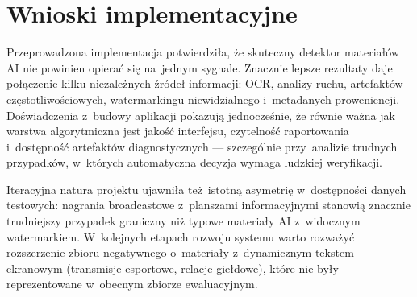 \section{Wnioski implementacyjne}

Przeprowadzona implementacja potwierdziła, że skuteczny detektor materiałów AI
nie powinien opierać się na~jednym sygnale. Znacznie lepsze rezultaty
daje połączenie kilku niezależnych źródeł informacji:
OCR, analizy ruchu, artefaktów częstotliwościowych,
watermarkingu niewidzialnego i~metadanych proweniencji.
Doświadczenia z~budowy aplikacji pokazują jednocześnie,
że równie ważna jak warstwa algorytmiczna jest jakość
interfejsu, czytelność raportowania i~dostępność
artefaktów diagnostycznych --- szczególnie przy~analizie trudnych
przypadków, w~których automatyczna decyzja wymaga ludzkiej weryfikacji.

Iteracyjna natura projektu ujawniła też~istotną asymetrię w~dostępności danych
testowych: nagrania broadcastowe z~planszami informacyjnymi stanowią
znacznie trudniejszy przypadek graniczny niż typowe materiały AI
z~widocznym watermarkiem. W~kolejnych etapach rozwoju systemu warto
rozważyć rozszerzenie zbioru negatywnego o~materiały z~dynamicznym
tekstem ekranowym (transmisje esportowe, relacje giełdowe),
które nie były reprezentowane w~obecnym zbiorze ewaluacyjnym.
